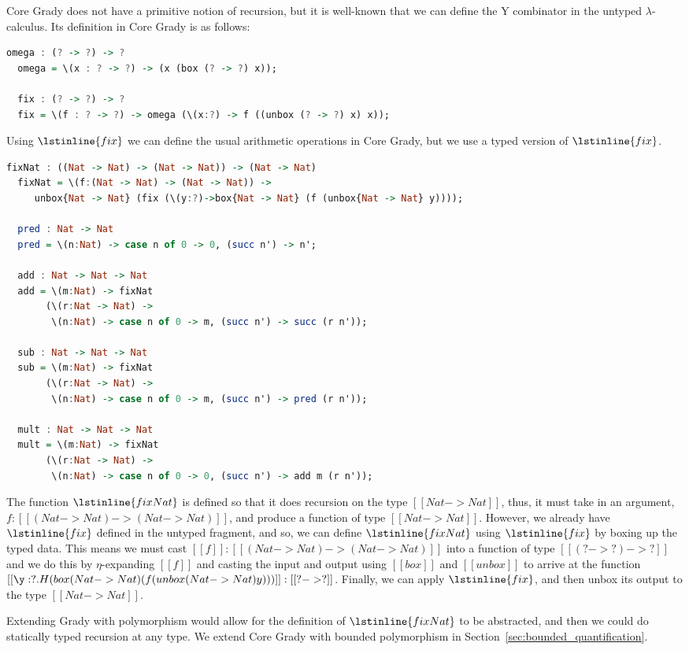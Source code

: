 Core Grady does not have a primitive notion of recursion, but it is
well-known that we can define the Y combinator in the untyped
$\lambda$-calculus.  Its definition in Core Grady is as follows:
\begin{lstlisting}[language=Haskell]
  omega : (? -> ?) -> ?
  omega = \(x : ? -> ?) -> (x (box (? -> ?) x));
  
  fix : (? -> ?) -> ?
  fix = \(f : ? -> ?) -> omega (\(x:?) -> f ((unbox (? -> ?) x) x));
\end{lstlisting}
Using $\lstinline{fix}$ we can define the usual arithmetic operations
in Core Grady, but we use a typed version of $\lstinline{fix}$.
\begin{lstlisting}[language=Haskell]
  fixNat : ((Nat -> Nat) -> (Nat -> Nat)) -> (Nat -> Nat)
  fixNat = \(f:(Nat -> Nat) -> (Nat -> Nat)) ->
     unbox{Nat -> Nat} (fix (\(y:?)->box{Nat -> Nat} (f (unbox{Nat -> Nat} y))));
  
  pred : Nat -> Nat
  pred = \(n:Nat) -> case n of 0 -> 0, (succ n') -> n';

  add : Nat -> Nat -> Nat
  add = \(m:Nat) -> fixNat
       (\(r:Nat -> Nat) ->
        \(n:Nat) -> case n of 0 -> m, (succ n') -> succ (r n'));

  sub : Nat -> Nat -> Nat
  sub = \(m:Nat) -> fixNat
       (\(r:Nat -> Nat) ->
        \(n:Nat) -> case n of 0 -> m, (succ n') -> pred (r n'));        
        
  mult : Nat -> Nat -> Nat
  mult = \(m:Nat) -> fixNat
       (\(r:Nat -> Nat) ->
        \(n:Nat) -> case n of 0 -> 0, (succ n') -> add m (r n'));
\end{lstlisting}
The function $\lstinline{fixNat}$ is defined so that it does recursion
on the type $[[Nat -> Nat]]$, thus, it must take in an argument,
$f : [[(Nat -> Nat) -> (Nat -> Nat)]]$, and
produce a function of type $[[Nat -> Nat]]$.  However, we
already have $\lstinline{fix}$ defined in the untyped fragment, and
so, we can define $\lstinline{fixNat}$ using $\lstinline{fix}$ by
boxing up the typed data.  This means we must cast $[[f]] : [[(Nat -> Nat) -> (Nat -> Nat)]]$ into a function of type
$[[(? -> ?) -> ?]]$ and we do this by $\eta$-expanding
$[[f]]$ and casting the input and output using $[[box]]$ and
$[[unbox]]$ to arrive at the function
$[[\y:?.H(box (Nat -> Nat) (f (unbox (Nat -> Nat) y)))]] : [[? -> ?]]$.  Finally, we can apply $\lstinline{fix}$, and then unbox its output to the type $[[Nat -> Nat]]$.

Extending Grady with polymorphism would allow for the definition of
$\lstinline{fixNat}$ to be abstracted, and then we could do statically
typed recursion at any type.  We extend Core Grady with bounded
polymorphism in Section~\ref{sec:bounded_quantification}.

